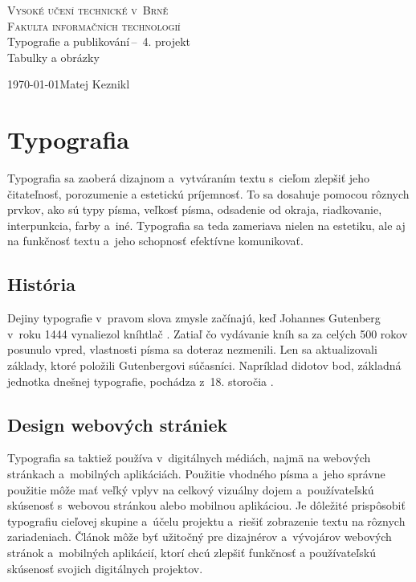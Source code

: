 \documentclass[a4paper, 11pt]{article}
\begin{document}
\begin{titlepage}
	\begin{center} 
		\textsc{\Huge Vysoké učení technické v~Brně\\
			\huge Fakulta informačních technologií \\}
			\LARGE Typografie a publikování\,--\ 4. projekt\\
			\Huge Tabulky a obrázky
			\end{center}
			\Large \today \hfill Matej Keznikl
\end{titlepage}

\section{Typografia}
Typografia sa zaoberá dizajnom a~vytváraním textu s~cieľom zlepšiť jeho čitateľnosť, porozumenie a estetickú príjemnosť. To sa dosahuje pomocou rôznych prvkov, ako sú typy písma, veľkosť písma, odsadenie od okraja, riadkovanie, interpunkcia, farby a~iné. Typografia sa teda zameriava nielen na estetiku, ale aj na funkčnosť textu a~jeho schopnosť efektívne komunikovať\cite{Knuth}. 

\subsection{História}
Dejiny typografie v~pravom slova zmysle začínajú, keď Johannes Gutenberg v~roku 1444 vynaliezol kníhtlač \cite{Gorecka}. Zatiaľ čo vydávanie kníh sa za celých 500 rokov posunulo vpred, vlastnosti písma sa doteraz nezmenili. Len sa aktualizovali základy, ktoré položili Gutenbergovi súčasníci. Napríklad didotov bod, základná jednotka dnešnej typografie, pochádza z~18. storočia \cite{Bures}.

\subsection{Design webových strániek}
Typografia sa taktiež používa v~digitálnych médiách, najmä na webových stránkach a~mobilných aplikáciách. Použitie vhodného písma a~jeho správne použitie môže mať veľký vplyv na celkový vizuálny dojem a~používateľskú skúsenosť s~webovou stránkou alebo mobilnou aplikáciou. Je dôležité prispôsobiť typografiu cieľovej skupine a~účelu projektu a~riešiť zobrazenie textu na rôznych zariadeniach. Článok môže byť užitočný pre dizajnérov a~vývojárov webových stránok a~mobilných aplikácií, ktorí chcú zlepšiť funkčnosť a používateľskú skúsenosť svojich digitálnych projektov\cite{WebsiteDesign}. 
\end{document}
